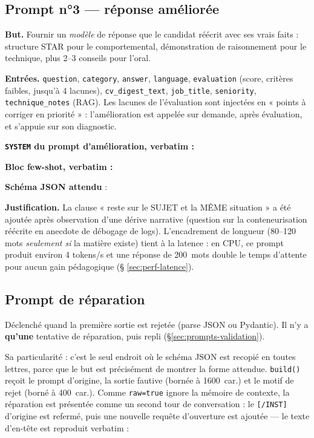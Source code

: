 \subsection{Prompt n°3 --- réponse améliorée}
\label{sec:prompt-improve}

\textbf{But.} Fournir un \emph{modèle} de réponse que le candidat réécrit avec
ses vrais faits : structure STAR pour le comportemental, démonstration de
raisonnement pour le technique, plus 2--3 conseils pour l'oral.

\textbf{Entrées.} \texttt{question}, \texttt{category}, \texttt{answer},
\texttt{language}, \texttt{evaluation} (score, critères faibles, jusqu'à 4
lacunes), \texttt{cv\_digest\_text}, \texttt{job\_title}, \texttt{seniority},
\texttt{technique\_notes} (RAG). Les lacunes de l'évaluation sont injectées en
« points à corriger en priorité » : l'amélioration est appelée sur demande, après
évaluation, et s'appuie sur son diagnostic.

\textbf{\texttt{SYSTEM} du prompt d'amélioration, verbatim :}


\textbf{Bloc few-shot, verbatim :}


\textbf{Schéma JSON attendu} :


\textbf{Justification.} La clause « reste sur le SUJET et la MÊME situation » a
été ajoutée après observation d'une dérive narrative (question sur la
conteneurisation réécrite en anecdote de débogage de logs). L'encadrement de
longueur (80--120 mots \emph{seulement si} la matière existe) tient à la
latence : en CPU, ce prompt produit environ 4 tokens/s et une réponse de
200~mots double le temps d'attente pour aucun gain pédagogique (§
\ref{sec:perf-latence}).

\subsection{Prompt de réparation}
\label{sec:prompt-repair}

Déclenché quand la première sortie est rejetée (parse JSON ou Pydantic). Il
n'y a \textbf{qu'une} tentative de réparation, puis repli
(§\ref{sec:prompts-validation}).

Sa particularité : c'est le seul endroit où le schéma JSON est recopié en
toutes lettres, parce que le but est précisément de montrer la forme attendue.
\texttt{build()} reçoit le prompt d'origine, la sortie fautive (bornée à
1600~car.) et le motif de rejet (borné à 400~car.). Comme \texttt{raw=true}
ignore la mémoire de contexte, la réparation est présentée comme un second tour
de conversation : le \texttt{[/INST]} d'origine est refermé, puis une nouvelle
requête d'ouverture est ajoutée --- le texte d'en-tête est reproduit verbatim :


